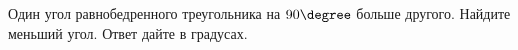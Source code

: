 \begin{ex}
	\begin{condition}
		Один угол равнобедренного треугольника на \( 90 \degree\) больше другого. Найдите меньший угол. Ответ дайте в градусах.
	\end{condition}
\end{ex}